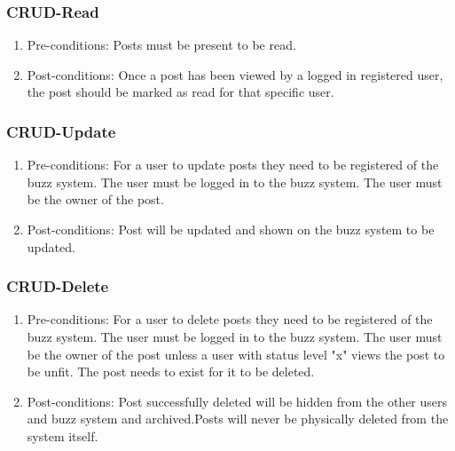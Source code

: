 \documentclass[12pt, oneside]{book}
\begin{document}
\subsubsection{CRUD-Read}
\begin{enumerate}
 \item Pre-conditions: Posts must be present to be read.
 \\
 \item Post-conditions: Once a post has been viewed by a logged in registered user, the post should be marked as read for that specific user.
  \\

\end{enumerate}

\subsubsection{CRUD-Update}
\begin{enumerate}
 \item Pre-conditions:  For a user to update posts they need to be registered of the buzz system. The user must be logged in to the buzz system. The user must be the owner of the post.
 \\
 \item Post-conditions: Post will be updated and shown on the buzz system to be updated.
   \\

\end{enumerate}

\subsubsection{CRUD-Delete}
\begin{enumerate}
 \item Pre-conditions:  For a user to delete posts they need to be registered of the buzz system. The user must be logged in to the buzz system. The user must be the owner of the post unless a user with status level "x" views the post to be unfit. The post needs to exist for it to be deleted.
 \\
 \item Post-conditions: Post successfully deleted will be hidden from the other users and buzz system and archived.Posts will never be physically deleted from the system itself.
   \\

\end{enumerate}
\end{document}
